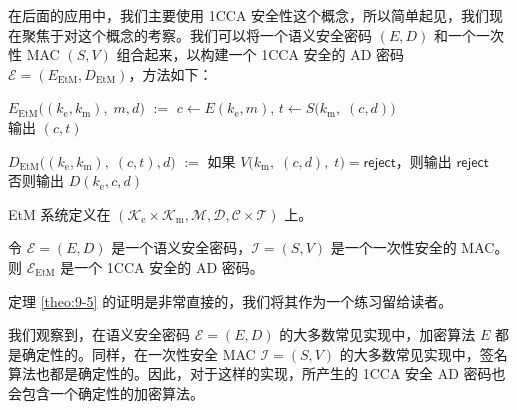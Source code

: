 \begin{snote}
在后面的应用中，我们主要使用 1CCA 安全性这个概念，所以简单起见，我们现在聚焦于对这个概念的考察。我们可以将一个语义安全密码 $(E,D)$ 和一个一次性 MAC $(S,V)$ 组合起来，以构建一个 1CCA 安全的 AD 密码 $\mathcal{E}=(E_\mathrm{EtM},D_\mathrm{EtM})$，方法如下：

\vspace*{10pt}

\hspace*{20pt} $E_\mathrm{EtM}\big((k_\mathrm{e},k_\mathrm{m}),\;m,d\big)$
				\quad $:=$ \quad
				$c\leftarrow E(k_\mathrm{e},m)$,
				\quad
				$t\leftarrow S\big(k_\mathrm{m},\;(c,d)\big)$\\
\hspace*{175.5pt} 输出 $(c,t)$

\vspace*{5pt}

\hspace*{7pt} $D_\mathrm{EtM}\big((k_\mathrm{e},k_\mathrm{m}),\;(c,t),d\big)$
				\quad $:=$ \quad
				如果 $V\big(k_\mathrm{m},\;(c,d),\;t\big)=\mathsf{reject}$，则输出 $\mathsf{reject}$\\
\hspace*{175.5pt} 否则输出 $D(k_\mathrm{e},c,d)$

\vspace*{10pt}

\noindent
EtM 系统定义在 $(\mathcal{K}_\mathrm{e}\times\mathcal{K}_\mathrm{m},\mathcal{M},\mathcal{D},\mathcal{C}\times\mathcal{T})$ 上。
\end{snote}

\begin{theorem}\label{theo:9-5}
令 $\mathcal{E}=(E,D)$ 是一个语义安全密码，$\mathcal{I}=(S,V)$ 是一个一次性安全的 MAC。则 $\mathcal{E}_\mathrm{EtM}$ 是一个 1CCA 安全的 AD 密码。
\end{theorem}

定理 \ref{theo:9-5} 的证明是非常直接的，我们将其作为一个练习留给读者。

我们观察到，在语义安全密码 $\mathcal{E}=(E,D)$ 的大多数常见实现中，加密算法 $E$ 都是确定性的。同样，在一次性安全 MAC $\mathcal{I}=(S,V)$ 的大多数常见实现中，签名算法也都是确定性的。因此，对于这样的实现，所产生的 1CCA 安全 AD 密码也会包含一个确定性的加密算法。